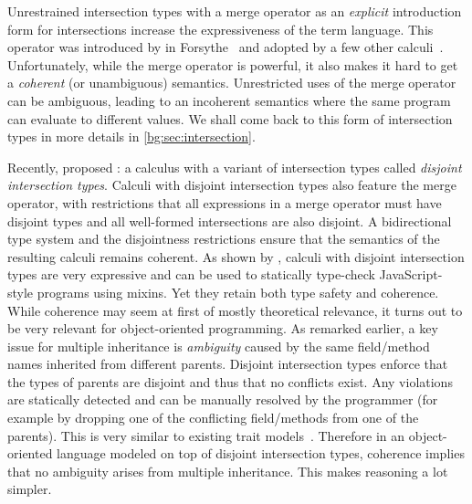 Unrestrained intersection types with a merge operator as an \emph{explicit}
introduction form for intersections increase the expressiveness of the term
language. This operator was introduced by \citeauthor{reynolds1988preliminary}
in Forsythe~\citep{reynolds1988preliminary} and adopted by a few other
calculi~\citep{Castagna_1992, dunfield2014elaborating, oliveira2016disjoint,
  alpuimdisjoint}. Unfortunately, while the merge operator is powerful, it also
makes it hard to get a \emph{coherent} (or unambiguous) semantics.
Unrestricted uses of the merge operator can be ambiguous, leading to an incoherent semantics
where the same program can evaluate to different values.
We shall come back to this form of intersection types in more details in
\cref{bg:sec:intersection}.

Recently, \citet{oliveira2016disjoint} proposed \oname: a calculus with a
variant of intersection types called \emph{disjoint intersection types}. Calculi
with disjoint intersection types also feature the merge operator, with restrictions
that all expressions in a merge operator must have disjoint types and all
well-formed intersections are also disjoint. A bidirectional type system and the
disjointness restrictions ensure that the semantics of the resulting calculi
remains coherent. As shown by \citet{alpuimdisjoint}, calculi with disjoint
intersection types are very expressive and can be used to statically type-check
JavaScript-style programs using mixins. Yet they retain both type safety and
coherence. While coherence may seem at first of mostly theoretical relevance, it
turns out to be very relevant for object-oriented programming. As remarked
earlier, a key issue for multiple inheritance is \emph{ambiguity} caused by the
same field/method names inherited from different parents. Disjoint intersection
types enforce that the types of parents are disjoint and thus that no conflicts
exist. Any violations are statically detected and can be manually resolved by
the programmer (for example by dropping one of the conflicting field/methods
from one of the parents). This is very similar to existing trait
models~\citep{scharli2003traits, Ducasse_2006}. Therefore in an object-oriented language
modeled on top of disjoint intersection types, coherence implies that no
ambiguity arises from multiple inheritance. This makes reasoning a lot simpler.

